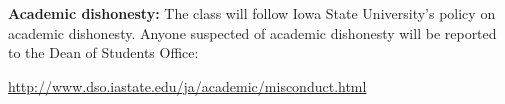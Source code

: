 \documentclass[10pt]{article}
\newcommand{\sep}{\vspace*{0.4cm}}
\begin{document}
\textbf{Academic dishonesty:}
The class will follow Iowa State University's policy on academic dishonesty.
Anyone suspected of academic dishonesty will be reported to the Dean of
Students Office:\\
\centerline{\url{http://www.dso.iastate.edu/ja/academic/misconduct.html}}
\sep


%
\end{document}
